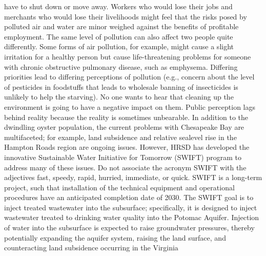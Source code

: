 \documentclass{article}
\begin{document}
have to shut down or move away. Workers who would lose their jobs and
merchants who would lose their livelihoods might feel that the risks
posed by polluted air and water are minor weighed against the benefits
of profitable employment. The same level of pollution can also affect
two people quite differently. Some forms of air pollution, for example,
might cause a slight irritation for a healthy person but cause
life-threatening problems for someone with chronic obstructive pulmonary
disease, such as emphysema. Differing priorities lead to differing
perceptions of pollution (e.g., concern about the level of pesticides in
foodstuffs that leads to wholesale banning of insecticides is unlikely
to help the starving). No one wants to hear that cleaning up the
environment is going to have a negative impact on them. Public
perception lags behind reality because the reality is sometimes
unbearable. In addition to the dwindling oyster population, the current
problems with Chesapeake Bay are multifaceted; for example, land
subsidence and relative sealevel rise in the Hampton Roads region are
ongoing issues. However, HRSD has developed the innovative Sustainable
Water Initiative for Tomorrow (SWIFT) program to address many of these
issues. Do not associate the acronym SWIFT with the adjectives fast,
speedy, rapid, hurried, immediate, or quick. SWIFT is a long-term
project, such that installation of the technical equipment and
operational procedures have an anticipated completion date of 2030. The
SWIFT goal is to inject treated wastewater into the subsurface;
specifically, it is designed to inject wastewater treated to drinking
water quality into the Potomac Aquifer. Injection of water into the
subsurface is expected to raise groundwater pressures, thereby
potentially expanding the aquifer system, raising the land surface, and
counteracting land subsidence occurring in the Virginia
\end{document}

